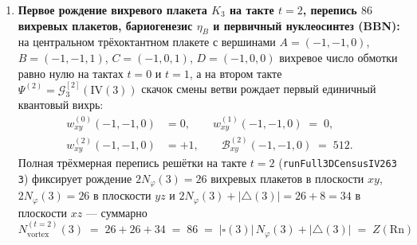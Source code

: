 \begin{theorem}[Затравочное состояние Каталана $\mathrm{IV}(3) = 263$, первое рождение вихря на такте $t = 2$, три теоремы абляции, бариогенезис $\eta_B$ и первичный нуклеосинтез $Y_p = 45/182$]
\begin{enumerate}[label=\textbf{(\arabic*)},leftmargin=*]
  \begin{equation}
    \label{eq:mono-domain-wall-chiral}
    \Phi_{\mathrm{field}}^{(0)}(0, 2, 2) + \Phi_{\mathrm{field}}^{(0)}(-1, 2, 2) \;=\; 76 + (-77) \;=\; -1 \;\ne\; 0.
  \end{equation}
  Три теоремы абляции (\texttt{ablation\_\allowbreak heisenberg\_\allowbreak threshold\_\_\allowbreak breaks\_\allowbreak octant\_\allowbreak silence}, \texttt{ablation\_\allowbreak tdiv\_\allowbreak destroys\_\allowbreak domain\_\allowbreak wall\_\allowbreak chiral\_\allowbreak asymmetry}, \texttt{ablation\_\allowbreak no\_\allowbreak denom\_\allowbreak guard\_\allowbreak corrupts\_\allowbreak t2\_\allowbreak vortex\_\allowbreak pair}) доказывают, что: (а)~снижение порога дискретности с $41$ до $15$ пропускает $\Phi_{\mathrm{raw},0}(2,2,2) = 15$ и разрушает тишину внутри октантов; (б)~замена \texttt{fdiv} на усечение к нулю \texttt{tdiv} заменяет $-77$ на $-76$, обнуляет сумму~\eqref{eq:mono-domain-wall-chiral} и уничтожает киральную асимметрию; (в)~удаление защиты вакуумного пола $\varepsilon(3) = 8\,192$ в~\eqref{eq:mono-field-dguard} приводит на такте $t = 1$ в узле $(-2, -1, -1)$ к делению на отрицательный сырой знаменатель $D_{\mathrm{raw},0}(-2,-1,-1) = -113\,826 < 0$ и разрушает рождение вихревой пары.
\item \textbf{Первое рождение вихревого плакета $K_3$ на такте $t = 2$, перепись $86$ вихревых плакетов, бариогенезис $\eta_B$ и первичный нуклеосинтез (BBN):}
  на центральном трёхоктантном плакете с вершинами $A=(-1,-1,0)$, $B=(-1,-1,1)$, $C=(-1,0,1)$, $D=(-1,0,0)$ вихревое число обмотки равно нулю на тактах $t = 0$ и $t = 1$, а на втором такте $\Psi^{(2)} = \mathcal{G}_3^{[2]}(\mathrm{IV}(3))$ скачок смены ветви рождает первый единичный квантовый вихрь:
  \begin{align}
    w_{xy}^{(0)}(-1,-1,0) &= 0, \qquad
    w_{xy}^{(1)}(-1,-1,0) \;=\; 0, \label{eq:mono-first-vortex-t01} \\
    w_{xy}^{(2)}(-1,-1,0) &= +1, \qquad
    \mathcal{B}_{xy}^{(2)}(-1,-1,0) \;=\; 512. \label{eq:mono-first-vortex-t2}
  \end{align}
  Полная трёхмерная перепись решётки на такте $t = 2$ (\texttt{runFull3DCensusIV263 3}) фиксирует рождение $2 N_\varphi(3) = 26$ вихревых плакетов в плоскости $xy$, $2 N_\varphi(3) = 26$ в плоскости $yz$ и $2 N_\varphi(3) + |{\triangle}(3)| = 26 + 8 = 34$ в плоскости $xz$ --- суммарно
  \begin{equation}
    \label{eq:mono-t2-86-plaquettes}
    N_{\mathrm{vortex}}^{(t=2)}(3) \;=\; 26 + 26 + 34 \;=\; 86 \;=\; |\square(3)|\,N_\varphi(3) + |{\triangle}(3)| \;=\; Z(\mathrm{Rn})

\end{equation}
\end{enumerate}
\end{theorem}
